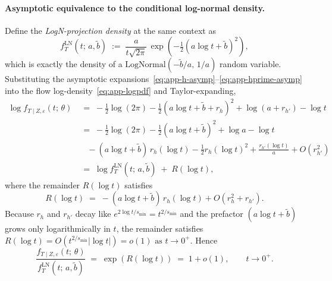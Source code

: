 \paragraph{Asymptotic equivalence to the conditional log-normal density.}
Define the \emph{LogN-projection density} at the same context as
\begin{equation}
    f_T^{\text{LN}}(t;\, a, \widetilde{b})
    \;:=\; \frac{a}{t \sqrt{2\pi}}\,
        \exp\!\left(-\tfrac{1}{2}(a \log t + \widetilde{b})^2\right),
    \label{eq:app-logn-density}
\end{equation}
which is exactly the density of a $\mathrm{LogNormal}(-\widetilde{b}/a,\, 1/a)$
random variable. Substituting the asymptotic
expansions~\eqref{eq:app-h-asymp}--\eqref{eq:app-hprime-asymp} into the
flow log-density~\eqref{eq:app-logpdf} and Taylor-expanding,
\begin{align*}
    \log f_{T \mid Z, \varepsilon}(t;\, \theta)
    &\;=\; -\tfrac{1}{2}\log(2\pi) - \tfrac{1}{2}(a \log t + \widetilde{b} + r_h)^2 + \log(a + r_{h'}) - \log t \\
    &\;=\; -\tfrac{1}{2}\log(2\pi) - \tfrac{1}{2}(a \log t + \widetilde{b})^2 + \log a - \log t \\
    &\quad - (a \log t + \widetilde{b})\, r_h(\log t) - \tfrac{1}{2} r_h(\log t)^2 + \frac{r_{h'}(\log t)}{a} + O(r_{h'}^2)\\
    &\;=\; \log f_T^{\text{LN}}(t;\, a, \widetilde{b}) \;+\; R(\log t),
\end{align*}
where the remainder $R(\log t)$ satisfies
\begin{equation}
    R(\log t) \;=\; -(a \log t + \widetilde{b})\, r_h(\log t) + O(r_h^2 + r_{h'}).
    \label{eq:app-remainder}
\end{equation}
Because $r_h$ and $r_{h'}$ decay like $e^{2 \log t / s_{\min}} = t^{2/s_{\min}}$
and the prefactor $(a \log t + \widetilde{b})$ grows only logarithmically
in $t$, the remainder satisfies
\(
    R(\log t) = O\!\left(t^{2/s_{\min}} |\log t|\right)
    = o(1) \text{ as } t \to 0^+.
\)
Hence
\begin{equation}
    \frac{f_{T \mid Z, \varepsilon}(t;\, \theta)}{f_T^{\text{LN}}(t;\, a, \widetilde{b})}
    \;=\; \exp\!\left(R(\log t)\right) \;=\; 1 + o(1),
    \qquad t \to 0^+.
    \label{eq:app-ratio-to-logn}
\end{equation}

